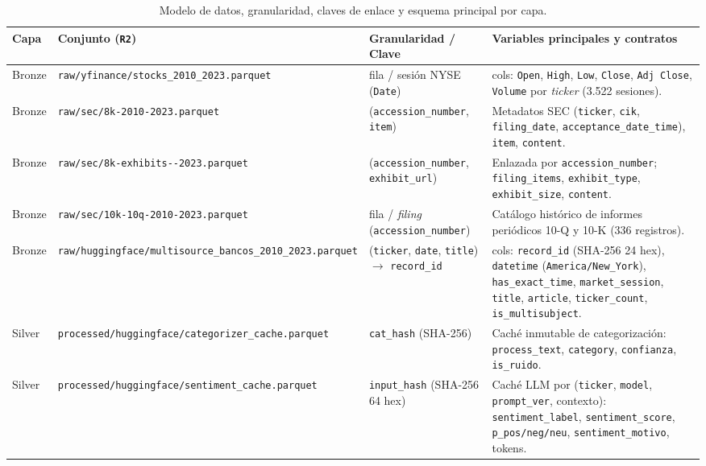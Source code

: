 \begin{table}[H]
    \centering
    \caption{Modelo de datos, granularidad, claves de enlace y esquema principal por capa.}
    \label{tab:modelo_datos_capas}
    \scriptsize
    \begin{tabularx}{\textwidth}{@{}l >{\raggedright\arraybackslash}p{3.9cm} >{\raggedright\arraybackslash}p{2.9cm} >{\raggedright\arraybackslash}X@{}}
        \toprule
        \textbf{Capa} & \textbf{Conjunto (\texttt{R2})} & \textbf{Granularidad / Clave} & \textbf{Variables principales y contratos} \\
        \midrule
        Bronze & \texttt{raw/yfinance/\allowbreak stocks\_2010\_2023.parquet} & 1 fila / sesión NYSE (\texttt{Date}) & 36 cols: \texttt{Open}, \texttt{High}, \texttt{Low}, \texttt{Close}, \texttt{Adj Close}, \texttt{Volume} por \textit{ticker} (3.522 sesiones). \\
        Bronze & \texttt{raw/sec/\allowbreak 8k-2010-2023.parquet} & (\texttt{accession\_number}, \texttt{item}) & Metadatos SEC (\texttt{ticker}, \texttt{cik}, \texttt{filing\_date}, \texttt{acceptance\_date\_time}), \texttt{item}, \texttt{content}. \\
        Bronze & \texttt{raw/sec/\allowbreak 8k-exhibits-\allowbreak 2010-2023.parquet} & (\texttt{accession\_number}, \texttt{exhibit\_url}) & Enlazada por \texttt{accession\_number}; \texttt{filing\_items}, \texttt{exhibit\_type}, \texttt{exhibit\_size}, \texttt{content}. \\
        Bronze & \texttt{raw/sec/\allowbreak 10k-10q-2010-2023.parquet} & 1 fila / \textit{filing} (\texttt{accession\_number}) & Catálogo histórico de informes periódicos 10-Q y 10-K (336 registros). \\
        Bronze & \texttt{raw/huggingface/\allowbreak multisource\_\allowbreak bancos\_2010\_2023.parquet} & (\texttt{ticker}, \texttt{date}, \texttt{title}) $\rightarrow$ \texttt{record\_id} & 16 cols: \texttt{record\_id} (SHA-256 24 hex), \texttt{datetime} (\texttt{America/New\_York}), \texttt{has\_exact\_time}, \texttt{market\_session}, \texttt{title}, \texttt{article}, \texttt{ticker\_count}, \texttt{is\_multisubject}. \\
        Silver & \texttt{processed/\allowbreak huggingface/\allowbreak categorizer\_\allowbreak cache.parquet} & \texttt{cat\_hash} (SHA-256) & Caché inmutable de categorización: \texttt{process\_text}, \texttt{category}, \texttt{confianza}, \texttt{is\_ruido}. \\
        Silver & \texttt{processed/\allowbreak huggingface/\allowbreak sentiment\_\allowbreak cache.parquet} & \texttt{input\_hash} (SHA-256 64 hex) & Caché LLM por (\texttt{ticker}, \texttt{model}, \texttt{prompt\_ver}, contexto): \texttt{sentiment\_label}, \texttt{sentiment\_score}, \texttt{p\_pos/neg/neu}, \texttt{sentiment\_motivo}, tokens. \\

\end{tabularx}
\end{table}

